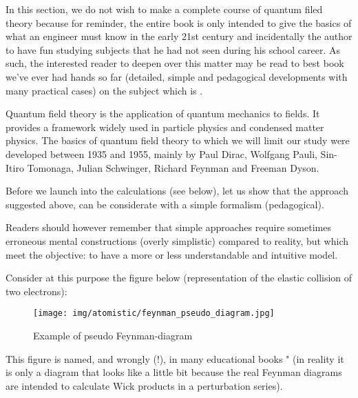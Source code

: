 	In this section, we do not wish to make a complete course of quantum filed theory because for reminder, the entire book is only intended to give the basics of what an engineer must know in the early 21st century and incidentally the author to have fun studying subjects that he had not seen during his school career. As such, the interested reader to deepen over this matter may be read to best book we've ever had hands so far (detailed, simple and pedagogical developments with many practical cases) on the subject which is \cite{desai2010quantum}.
	
	\begin{tcolorbox}[title=Remark,colframe=black,arc=10pt]
	Quantum field theory is the application of quantum mechanics to fields. It provides a framework widely used in particle physics and condensed matter physics. The basics of quantum field theory to which we will limit our study were developed between 1935 and 1955, mainly by Paul Dirac, Wolfgang Pauli, Sin-Itiro Tomonaga, Julian Schwinger, Richard Feynman and Freeman Dyson.
	\end{tcolorbox}
	
	Before we launch into the calculations (see below), let us show that the approach suggested above, can be considerate with a simple formalism (pedagogical).
	
	Readers should however remember that simple approaches require sometimes erroneous mental constructions (overly simplistic) compared to reality, but which meet the objective: to have a more or less understandable and intuitive model.
	
	Consider at this purpose the figure below (representation of the elastic collision of two electrons):
	\begin{figure}[H]
		\begin{center}
		\texttt{[image: img/atomistic/feynman\_pseudo\_diagram.jpg]}
		\end{center}	
		\caption{Example of pseudo Feynman-diagram}
	\end{figure}
	This figure is named, and wrongly (!), in many educational books " (in reality it is only a diagram that looks like a little bit because the real Feynman diagrams are intended to calculate Wick products in a perturbation series).
	
